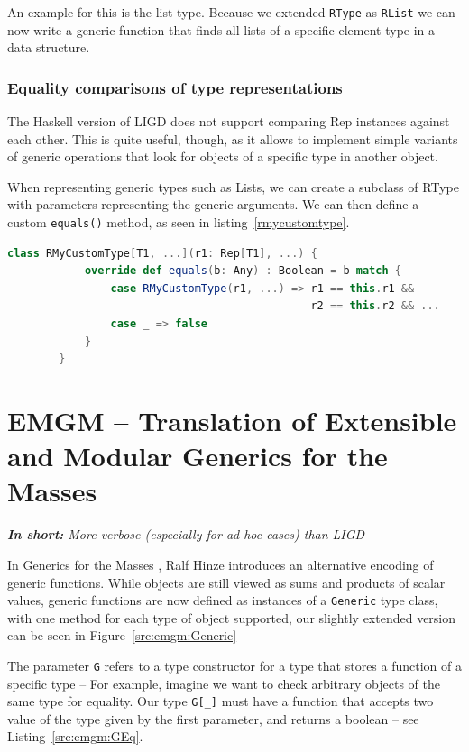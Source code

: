 \documentclass[abstracton,parskip=half]{scrreprt}
\newcommand{\cd}{\texttt}
\newcommand{\summary}[1]{\textit{\textbf{In short:} #1}}
\begin{document}
    An example for this is the list type. Because we extended \cd{RType} as
    \cd{RList} we can now write a generic function that finds all lists of a
    specific element type in a data structure.

    \subsubsection{Equality comparisons of type representations}
    The Haskell version of LIGD does not support comparing Rep instances
    against each other. This is quite useful, though, as it allows to
    implement simple variants of generic operations that look for objects
    of a specific type in another object.


    When representing generic types such as Lists, we can create a subclass
    of RType with parameters representing the generic arguments. We can then
    define a custom \cd{equals()} method, as seen in listing~\ref{rmycustomtype}.

    \begin{lstlisting}[language=Scala,gobble=8,float,caption=Representing custom generic types,label=rmycustomtype]
        class RMyCustomType[T1, ...](r1: Rep[T1], ...) {
            override def equals(b: Any) : Boolean = b match {
                case RMyCustomType(r1, ...) => r1 == this.r1 &&
                                               r2 == this.r2 && ...
                case _ => false
            }
        }
    \end{lstlisting}



    \section{EMGM -- Translation of Extensible and Modular Generics for the Masses}
    \summary{More verbose (especially for ad-hoc cases) than LIGD}


    In Generics for the Masses \cite{GM}, Ralf Hinze introduces an alternative
    encoding of generic functions. While objects are still viewed as sums and
    products of scalar values, generic functions are now defined as instances
    of a \cd{Generic} type class, with one method for each type of object
    supported, our slightly extended version can be seen in Figure~\ref{src:emgm:Generic}
    
    The parameter \cd{G} refers to a type constructor for a type that stores
    a function of a specific type -- For example, imagine we want to check
    arbitrary objects of the same type for equality. Our type \cd{G[\_]} must have a function that accepts two
    value of the type given by the first parameter, and returns a boolean
    -- see Listing~\ref{src:emgm:GEq}.
    
\end{document}
